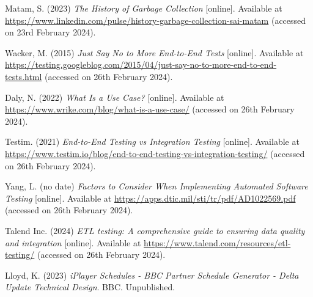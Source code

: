 \noindent Matam, S. (2023) \textit{The History of Garbage Collection} [online]. Available at \url{https://www.linkedin.com/pulse/history-garbage-collection-sai-matam} (accessed on 23rd February 2024).
\vspace{0.2cm}

\noindent Wacker, M. (2015) \textit{Just Say No to More End-to-End Tests} [online]. Available at \url{https://testing.googleblog.com/2015/04/just-say-no-to-more-end-to-end-tests.html} (accessed on 26th February 2024).
\vspace{0.2cm}

\noindent Daly, N. (2022) \textit{What Is a Use Case?} [online]. Available at \url{https://www.wrike.com/blog/what-is-a-use-case/} (accessed on 26th February 2024).
\vspace{0.2cm}

\noindent Testim. (2021) \textit{End-to-End Testing vs Integration Testing} [online]. Available at \url{https://www.testim.io/blog/end-to-end-testing-vs-integration-testing/} (accessed on 26th February 2024).
\vspace{0.2cm}

\noindent Yang, L. (no date) \textit{Factors to Consider When Implementing Automated Software Testing} [online]. Available at \url{https://apps.dtic.mil/sti/tr/pdf/AD1022569.pdf} (accessed on 26th February 2024).
\vspace{0.2cm}

\noindent Talend Inc. (2024) \textit{ETL testing: A comprehensive guide to ensuring data quality and integration} [online]. Available at \url{https://www.talend.com/resources/etl-testing/} (accessed on 26th February 2024).
\vspace{0.2cm}

\noindent Lloyd, K. (2023) \textit{iPlayer Schedules - BBC Partner Schedule Generator - Delta Update Technical Design}. BBC. Unpublished.
\vspace{0.2cm}

\newpage
